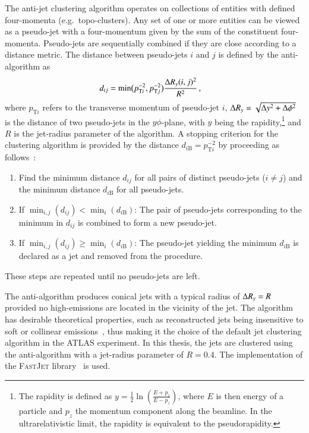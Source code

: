 The anti-\kt jet clustering algorithm operates on collections of entities with
defined four-momenta (e.g.\ topo-clusters). Any set of one or more entities can
be viewed as a pseudo-jet with a four-momentum given by the sum of the
constituent four-momenta. Pseudo-jets are sequentially combined if they are
close according to a distance metric. The distance between pseudo-jets $i$ and
$j$ is defined by the anti-\kt algorithm as~\cite{Cacciari:2008gp}
\begin{align*}
  d_{ij} &= \min\bigl( p_{\text{T}i}^{-2}, p_{\text{T}j}^{-2} \bigr)
           \frac{ \Delta R_y(i, j)^2 }{ R^2 } \,\text{,}
\end{align*}
where $p_{\text{T}i}$ refers to the transverse momentum of pseudo-jet $i$,
$\Delta R_y = \sqrt{\Delta y^2 + \Delta \phi^2}$ is the distance of two pseudo-jets in
the $y\phi$-plane, with $y$ being the rapidity,\footnote{The rapidity is defined
  as
  $y = \frac{1}{2} \ln\mathopen{}\left( \frac{E + p_z}{E - p_z}
  \right)\mathclose{}$, where $E$ is then energy of a particle and $p_z$ the
  momentum component along the beamline. In the ultrarelativistic limit, the
  rapidity is equivalent to the pseudorapidity.} and $R$ is the jet-radius
parameter of the algorithm. A stopping criterion for the clustering algorithm is
provided by the distance $d_{i\text{B}} = p_{\text{T}i}^{-2}$ by proceeding as
follows~\cite{Cacciari:2008gp}:
\begin{enumerate}
\item Find the minimum distance $d_{ij}$ for all pairs of distinct pseudo-jets
  ($i \neq j$) and the minimum distance $d_{i\text{B}}$ for all pseudo-jets.

\item If $\min_{i,j}(d_{ij}) < \min_{i}(d_{i\text{B}})$: The pair of pseudo-jets
  corresponding to the minimum in $d_{ij}$ is combined to form a new pseudo-jet.

\item If $\min_{i,j}(d_{ij}) \geq \min_{i}(d_{i\text{B}})$: The pseudo-jet
  yielding the minimum $d_{i\text{B}}$ is declared as a jet and removed from the
  procedure.
\end{enumerate}
These steps are repeated until no pseudo-jets are left.

The anti-\kt algorithm produces conical jets with a typical radius of $\Delta R_y = R$
provided no high-\pT emissions are located in the vicinity of the jet. The
algorithm has desirable theoretical properties, such as reconstructed jets being
insensitive to soft or collinear emissions~\cite{Cacciari:2008gp}, thus making
it the choice of the default jet clustering algorithm in the ATLAS
experiment. In this thesis, the jets are clustered using the anti-\kt algorithm
with a jet-radius parameter of $R = 0.4$. The implementation of the
\textsc{FastJet} library~\cite{Fastjet} is used.


